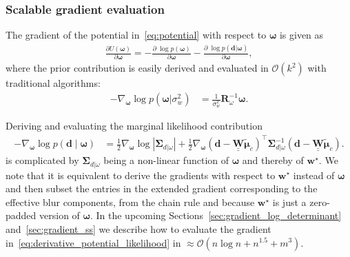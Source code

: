 \documentclass[12pt]{article}
\newcommand{\mybcirc}[1] {\underline{\underline{\bm{#1}}}}
\begin{document}
\subsubsection{Scalable gradient evaluation}
The gradient of the potential in~\eqref{eq:potential} with respect to $\bm{\omega}$ is given as
\begin{equation} \label{eq:grad_potential}
\begin{split}
    \frac{\partial U(\bm{\omega})}{\partial \bm{\omega}}
    = -\frac{\partial \; \log p(\bm{\omega})}{\partial \bm{\omega}}  
    - \frac{\partial \; \log p(\bm{d}|\bm{\omega})}{\partial \bm{\omega}},
\end{split}
\end{equation}
where the prior contribution is easily derived and evaluated in $\mathcal{O}(k^2)$ with traditional algorithms:
\begin{equation}
\begin{split}
    -\nabla_{\bm{\omega}} \log p(\bm{\omega}|\sigma_w^2) 
    &= \frac{1}{\sigma_w^2} \bm{R}_{\omega}^{-1}\bm{\omega}.
\end{split}
\end{equation}

Deriving and evaluating the marginal likelihood contribution
\begin{equation} \label{eq:derivative_potential_likelihood}
\begin{split}
    -\nabla_{\bm{\omega}}  \log p(\bm{d} \mid \bm{\omega}) &=
    \frac{1}{2} \nabla_{\bm{\omega}} \log |\bm{\Sigma}_{d|\omega}|
    + \frac{1}{2} \nabla_{\bm{\omega}}  
        (\bm{d} - \mybcirc{W} \tilde{\bm{\mu}}_c)^{\top} 
        \bm{\Sigma}_{d|\omega}^{-1} 
        (\bm{d} - \mybcirc{W} \tilde{\bm{\mu}}_c).
\end{split}
\end{equation}
is complicated by $\bm{\Sigma}_{d|\omega}$ being a non-linear function of $\bm{\omega}$ and thereby of $\bm{w}^{\star}$.
We note that it is equivalent to derive the gradients with respect to $\bm{w}^{\star}$ instead of $\bm{\omega}$ and then subset the entries in the extended gradient corresponding to the effective blur components, from the chain rule and because $\bm{w}^{\star}$ is just a zero-padded version of $\bm{\omega}$. 
In the upcoming Sections~\ref{sec:gradient_log_determinant} and~\ref{sec:gradient_ss} we describe how to evaluate the gradient in~\eqref{eq:derivative_potential_likelihood} in $\approx \mathcal{O}(n\log n + n^{1.5} + m^3)$.
\end{document}
